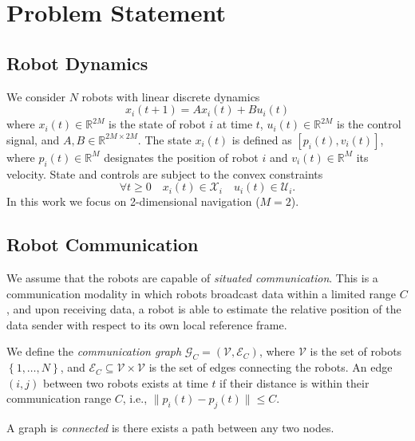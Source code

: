 \section{Problem Statement}
\label{sec:probstat}

\subsection{Robot Dynamics}
\label{sec:robotdynamics}

We consider $N$ robots with linear discrete dynamics
$$
x_i(t+1) = A x_i(t) + B u_i(t)
$$
where $x_i(t) \in \mathbb{R}^{2M}$ is the state of robot $i$ at time
$t$, $u_i(t) \in \mathbb{R}^{2M}$ is the control signal, and
$A,B \in \mathbb{R}^{2M \times 2M}$. The state $x_i(t)$ is defined as
$\left[p_i(t), v_i(t)\right]$, where $p_i(t) \in \mathbb{R}^M$
designates the position of robot $i$ and $v_i(t) \in \mathbb{R}^M$ its
velocity. State and controls are subject to the convex constraints
$$
\forall t \ge 0 \quad x_i(t) \in \mathcal{X}_i \quad u_i(t) \in \mathcal{U}_i.
$$
In this work we focus on 2-dimensional navigation ($M = 2$).

\subsection{Robot Communication}
\label{sec:robotcommunication}

We assume that the robots are capable of \emph{situated
  communication}. This is a communication modality in which robots
broadcast data within a limited range $C$, and upon receiving data, a
robot is able to estimate the relative position of the data sender
with respect to its own local reference frame.

We define the \emph{communication graph}
$\mathcal{G}_C = (\mathcal{V}, \mathcal{E}_C)$, where $\mathcal{V}$ is
the set of robots $\left\{1, \dots, N\right\}$, and
$\mathcal{E}_C \subseteq \mathcal{V} \times \mathcal{V}$ is the set of edges
connecting the robots. An edge $(i,j)$ between two robots exists at
time $t$ if their distance is within their communication range $C$,
i.e.,  $\parallel p_i(t) - p_j(t) \parallel \le C$.

\begin{definition}
  A graph is \emph{connected} is there exists a path between any two nodes.
\end{definition}

